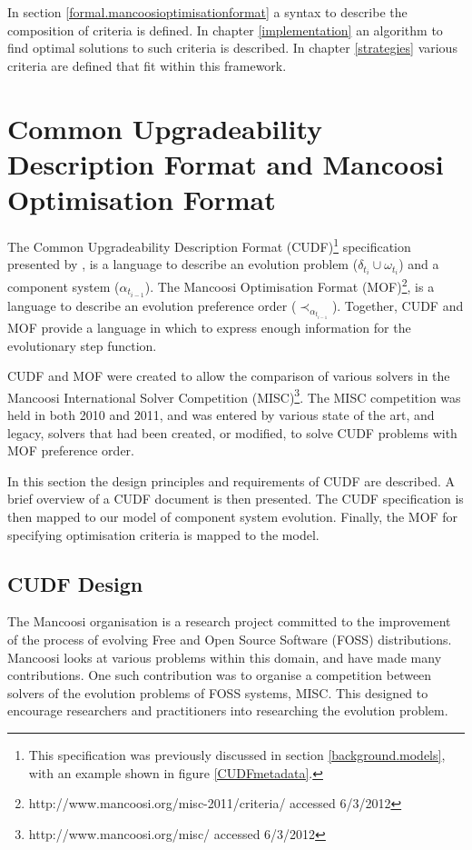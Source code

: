 In section \ref{formal.mancoosioptimisationformat} a syntax to describe the composition of criteria is defined. 
In chapter \ref{implementation} an algorithm to find optimal solutions to such criteria is described.
In chapter \ref{strategies} various criteria are defined that fit within this framework.

\section{Common Upgradeability Description Format and Mancoosi Optimisation Format}
\label{formal.cudf}
The Common Upgradeability Description Format (CUDF)\footnote{This specification was previously discussed in section \ref{background.models}, with an example shown in figure \ref{CUDFmetadata}.
}
specification presented by \citep{treinen2009common}, is a language to describe an evolution problem ($\delta_{t_i} \cup \omega_{t_i}$) and a component system ($\alpha_{t_{i-1}}$). 
The Mancoosi Optimisation Format (MOF)\footnote{http://www.mancoosi.org/misc-2011/criteria/ accessed 6/3/2012}, is a language to describe an evolution preference order ($\prec_{\alpha_{t_{i-1}}}$).
Together, CUDF and MOF provide a language in which to express enough information for the evolutionary step function.

CUDF and MOF were created to allow the comparison of various solvers in the Mancoosi International Solver Competition (MISC)\footnote{http://www.mancoosi.org/misc/ accessed 6/3/2012}.
The MISC competition was held in both 2010 and 2011,
and was entered by various state of the art, and legacy, solvers that had been created, or modified, to solve CUDF problems with MOF preference order.

In this section the design principles and requirements of CUDF are described.
A brief overview of a CUDF document is then presented.
The CUDF specification is then mapped to our model of component system evolution.
Finally, the MOF for specifying optimisation criteria is mapped to the model.

\subsection{CUDF Design}
\label{formal.cudfDesign}
The Mancoosi organisation is a research project committed to the improvement of the process of evolving Free and Open Source Software (FOSS) distributions.
Mancoosi looks at various problems within this domain, and have made many contributions.
One such contribution was to organise a competition between solvers of the evolution problems of FOSS systems, MISC.
This designed to encourage researchers and practitioners into researching the evolution problem.

